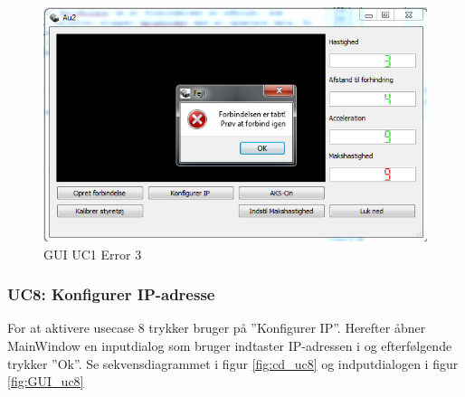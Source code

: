 \begin{figure}[H]
\centering
\includegraphics[width=\textwidth* 3/4,height=\textwidth* 9/20 ]{../fig/billeder/gui_uc1_error_3.png}
\caption{GUI UC1 Error 3}
\label{fig:GUI_uc1_error_3}
\end{figure}

\subsubsection{UC8: Konfigurer IP-adresse}
For at aktivere usecase 8 trykker bruger på ''Konfigurer IP''. Herefter åbner MainWindow en inputdialog som bruger indtaster IP-adressen i og efterfølgende trykker ''Ok''. Se sekvensdiagrammet i figur \ref{fig:cd_uc8} og indputdialogen i figur \ref{fig:GUI_uc8} 

